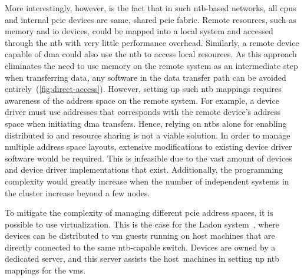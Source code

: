 More interestingly, however, is the fact that in such \gls{ntb}-based networks, all \glspl{cpu} and internal \gls{pcie} devices are same, shared \gls{pcie} fabric.
%
Remote resources, such as memory and \gls{io} devices, could be mapped into a local system and accessed through the \gls{ntb} with very little performance overhead.
%
Similarly, a remote device capable of \gls{dma} could also use the \gls{ntb} to access local resources.
%
As this approach eliminates the need to use memory on the remote system as an intermediate step when transferring data, any software in the data transfer path can be avoided entirely~(\cref{fig:direct-access}).
%
However, setting up such \gls{ntb} mappings requires awareness of the address space on the remote system.
%
For example, a device driver must use addresses that corresponds with the remote device's address space when initiating \gls{dma} transfers.
%
Hence, relying on \glspl{ntb} alone for enabling distributed \gls{io} and resource sharing is not a viable solution.
%
In order to manage multiple address space layouts, extensive modifications to existing device driver software would be required.
%
This is infeasible due to the vast amount of devices and device driver implementations that exist.
%
Additionally, the programming complexity would greatly increase when the number of independent systems in the cluster increase beyond a few nodes.




To mitigate the complexity of managing different \gls{pcie} address spaces, it is possible to use virtualization.
%
This is the case for the Ladon system~\cite{Tu2013}, where devices can be distributed to \gls{vm} \glspl{guest} running on host machines that are directly connected to the same \gls{ntb}-capable switch.
%
Devices are owned by a dedicated server, and this server assists the host~machines in setting up \gls{ntb} mappings for the \glspl{vm}.

%
%
%
%
%
%
%



